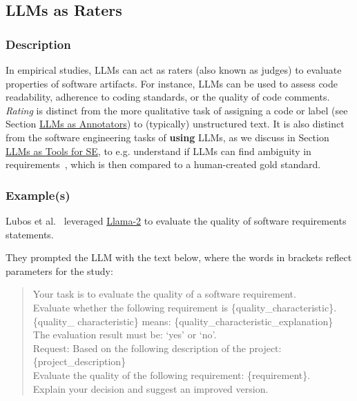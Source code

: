 \documentclass[11pt]{article}
\begin{document}
\subsection{LLMs as Raters}

\subsubsection{Description}

In empirical studies, LLMs can act as raters (also known as judges) to evaluate properties of software artifacts.%
For instance, LLMs can be used to assess code readability, adherence to coding standards, or the quality of code comments. 
\emph{Rating} is distinct from the more qualitative task of assigning a code or label (see Section \href{/study-types/#llms-as-annotators}{LLMs as Annotators}) to (typically) unstructured text.
It is also distinct from the software engineering tasks of \textbf{using} LLMs, as we discuss in Section \href{/study-types/#introduction-llms-as-tools-for-software-engineers}{LLMs as Tools for SE}, to e.g. understand if LLMs can find ambiguity in requirements~\cite{DBLP:conf/icse/EzziniA0S22}, which is then compared to a human-created gold standard.

\subsubsection{Example(s)}
Lubos et al.~\cite{DBLP:conf/re/LubosFTGMEL24} leveraged \href{https://www.llama.com/llama2/}{Llama-2} to evaluate the quality of software requirements statements. 

They prompted the LLM with the text below, where the words in brackets reflect parameters for the study:

\begin{quote}
Your task is to evaluate the quality of a software requirement.\\
Evaluate whether the following requirement is \{quality_characteristic\}. \\
\{quality_ characteristic\} means: \{quality_characteristic_explanation\}\\
The evaluation result must be: `yes' or `no'.\\
Request: Based on the following description of the project:
\{project_description\}\\
Evaluate the quality of the following requirement: \{requirement\}.\\
Explain your decision and suggest an improved version.\\
\end{quote}
\end{document}
